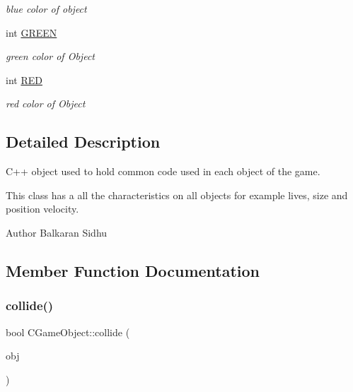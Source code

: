 \begin{DoxyCompactItemize}
\begin{DoxyCompactList}\small\item\em blue color of object \end{DoxyCompactList}\item 
\hypertarget{class_c_game_object_a50fdf0e7aa14e28561fe1a61d3287d38}{}\label{class_c_game_object_a50fdf0e7aa14e28561fe1a61d3287d38} 
int \hyperlink{class_c_game_object_a50fdf0e7aa14e28561fe1a61d3287d38}{G\+R\+E\+EN}
\begin{DoxyCompactList}\small\item\em green color of Object \end{DoxyCompactList}\item 
\hypertarget{class_c_game_object_aabc5155062cb7bfdee1ebce8f2d6ff76}{}\label{class_c_game_object_aabc5155062cb7bfdee1ebce8f2d6ff76} 
int \hyperlink{class_c_game_object_aabc5155062cb7bfdee1ebce8f2d6ff76}{R\+ED}
\begin{DoxyCompactList}\small\item\em red color of Object \end{DoxyCompactList}\end{DoxyCompactItemize}


\subsection{Detailed Description}
C++ object used to hold common code used in each object of the game. 

This class has a all the characteristics on all objects for example lives, size and position velocity.

\begin{DoxyAuthor}{Author}
Balkaran Sidhu 
\end{DoxyAuthor}


\subsection{Member Function Documentation}
\hypertarget{class_c_game_object_a095ec5e8e92a7442f444a1d3b7e200da}{}\label{class_c_game_object_a095ec5e8e92a7442f444a1d3b7e200da} 
\subsubsection{\texorpdfstring{collide()}{collide()}}
{\footnotesize\ttfamily bool C\+Game\+Object\+::collide (\begin{DoxyParamCaption}\item[{\hyperlink{class_c_game_object}{C\+Game\+Object} \&}]{obj }\end{DoxyParamCaption})}



